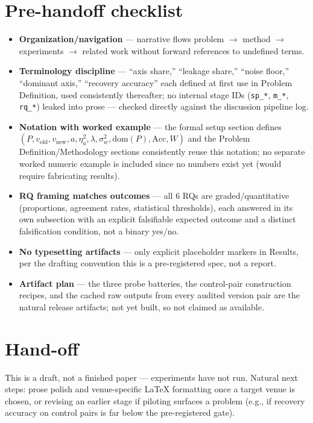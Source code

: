 \documentclass[11pt]{article}
\begin{document}
\section*{Pre-handoff checklist}
\begin{itemize}[leftmargin=1.4em]
\item \textbf{Organization/navigation} --- narrative flows problem $\to$ method $\to$ experiments $\to$ related work without forward references to undefined terms.
\item \textbf{Terminology discipline} --- ``axis share,'' ``leakage share,'' ``noise floor,'' ``dominant axis,'' ``recovery accuracy'' each defined at first use in Problem Definition, used consistently thereafter; no internal stage IDs (\texttt{sp\_*}, \texttt{m\_*}, \texttt{rq\_*}) leaked into prose --- checked directly against the discussion pipeline log.
\item \textbf{Notation with worked example} --- the formal setup section defines $(P, v_{\mathrm{old}}, v_{\mathrm{new}}, a, \eta^2_a, \lambda, \sigma^2_w, \mathrm{dom}(P), \mathrm{Acc}, W)$ and the Problem Definition/Methodology sections consistently reuse this notation; no separate worked numeric example is included since no numbers exist yet (would require fabricating results).
\item \textbf{RQ framing matches outcomes} --- all 6 RQs are graded/quantitative (proportions, agreement rates, statistical thresholds), each answered in its own subsection with an explicit falsifiable expected outcome and a distinct falsification condition, not a binary yes/no.
\item \textbf{No typesetting artifacts} --- only explicit placeholder markers in Results, per the drafting convention this is a pre-registered spec, not a report.
\item \textbf{Artifact plan} --- the three probe batteries, the control-pair construction recipes, and the cached raw outputs from every audited version pair are the natural release artifacts; not yet built, so not claimed as available.
\end{itemize}

\section*{Hand-off}
This is a draft, not a finished paper --- experiments have not run. Natural next steps: prose polish and venue-specific LaTeX formatting once a target venue is chosen, or revising an earlier stage if piloting surfaces a problem (e.g., if recovery accuracy on control pairs is far below the pre-registered gate).



\end{document}
